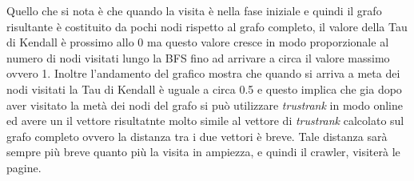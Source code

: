  Quello che si nota è che quando la visita è nella fase iniziale e quindi il grafo risultante è costituito da pochi nodi rispetto al grafo completo, il valore della Tau di Kendall è prossimo allo 0 ma questo valore cresce in modo proporzionale al numero di nodi visitati lungo la BFS fino ad arrivare a circa il valore massimo ovvero 1. Inoltre l'andamento del grafico mostra che quando si arriva a meta dei nodi visitati la Tau di Kendall è uguale a circa 0.5 e questo implica che gia dopo aver visitato la metà dei nodi del grafo si può utilizzare \textit{trustrank} in modo online ed avere un il vettore risultatnte molto simile al vettore di \textit{trustrank} calcolato sul grafo completo ovvero la distanza tra i due vettori è breve. Tale distanza sarà sempre più breve quanto più la visita in ampiezza, e quindi il crawler, visiterà le pagine.

